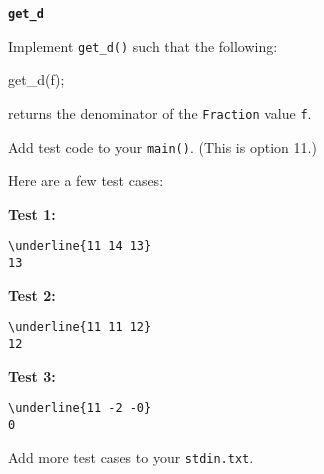 \textbf{\texttt{get\_d}}

Implement \verb!get_d()! such that the following:
\begin{console}
get_d(f);
\end{console}
returns the denominator of the \verb!Fraction! value \verb!f!.

Add test code to your \verb!main()!.
(This is option 11.)

Here are a few test cases:

\textbf{Test 1:}
\begin{Verbatim}[frame=single, commandchars=\\\{\}]
\underline{11 14 13}
13
\end{Verbatim}

\textbf{Test 2:}
\begin{Verbatim}[frame=single, commandchars=\\\{\}]
\underline{11 11 12}
12
\end{Verbatim}

\textbf{Test 3:}
\begin{Verbatim}[frame=single, commandchars=\\\{\}]
\underline{11 -2 -0}
0
\end{Verbatim}

Add more test cases to your \verb!stdin.txt!.

